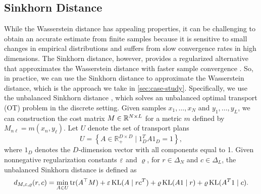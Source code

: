 \subsection{Sinkhorn Distance}
\label{sec:sinkhorn}
% 
While the Wasserstein distance has appealing properties, it can be challenging to obtain an accurate estimate from finite samples
because it is sensitive to small changes in empirical distributions and suffers from slow convergence rates in high dimensions. 
The Sinkhorn distance, however, provides a regularized alternative that approximates the Wasserstein distance with faster sample convergence \citep{fast_sh}.
So, in practice, we can use the Sinkhorn distance to approximate the Wasserstein distance, 
which is the approach we take in \cref{sec:case-study}. 
Specifically, we use the unbalanced Sinkhorn distance \citep{unbsinkhorn}, which solves an unbalanced optimal transport (OT) problem
 in the discrete setting.
 Given samples $x_{1},\dots,x_{N}$ and $y_{1},\dots,y_{L}$, we can construction the 
cost matrix $M \in \mathbb{R}^{N \times L}$ for a metric $m$ defined by $M_{n\ell} = m(x_{n}, y_{\ell})$. 
Let $U$ denote the set of transport plans 
\[
U = \left\{ A \in \mathbb{R}_+^{D \times D} \mid {1}_D^T A {1}_D = 1 \right\},
\]
where $1_{D}$ denotes the $D$-dimension vector with all components equal to 1. 
Given nonnegative regularization constants $\varepsilon$ and $\varrho$, for $r \in \Delta_{N}$ and $c \in \Delta_{L}$,
the unbalanced Sinkhorn distance is defined as
\[
	d_{M,\varepsilon, \varrho}(r, c) = \min_{A\in U
    } \mathrm{tr}(A^{\top}M) + \varepsilon\,\mathrm{KL}(A \mid rc^T)
	+ \varrho\,\mathrm{KL}(A 1 \mid r)
	+ \varrho\,\mathrm{KL}(A^T 1 \mid c). 
\]
